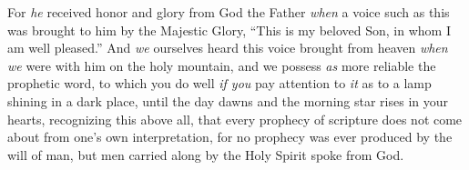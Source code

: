 \begin{biblechapter}
\verse For \textit{he} received honor and glory from God the Father \textit{when} a voice such as this was brought to him by the Majestic Glory, “This is my beloved Son, in whom I am well pleased.”
\verse And \textit{we} ourselves heard this voice brought from heaven \textit{when we} were with him on the holy mountain,
\verse and we possess \textit{as} more reliable the prophetic word, to which you do well \textit{if you} pay attention to \textit{it} as to a lamp shining in a dark place, until the day dawns and the morning star rises in your hearts,
\verse recognizing this above all, that every prophecy of scripture does not come about from one’s own interpretation,
\verse for no prophecy was ever produced by the will of man, but men carried along by the Holy Spirit spoke from God.
\end{biblechapter}


